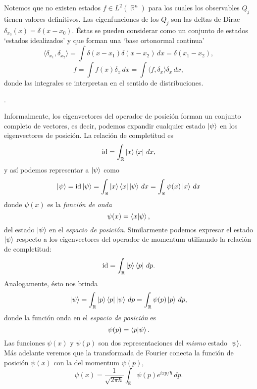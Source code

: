 \documentclass[a4paper]{report}
\DeclareMathOperator{\R}{\mathbb{R}}
\let\H\relax
\DeclareMathOperator{\H}{\mathcal H}
\DeclareMathOperator{\id}{id}
\begin{document}
  Notemos que no existen estados $f \in L^2(\R^{n})$ para
  los cuales los observables $Q_j$ tienen valores
  definitivos. Las eigenfunciones de los $Q_j$ son las
  deltas de Dirac $\delta_{x_0}(x) = \delta(x - x_0)$. Éstas
  se pueden considerar como un conjunto de estados `estados
  idealizados' y que forman una `base ortonormal continua'
  \[
    \langle \delta_{x_1}, \delta_{x_2} \rangle
    = \int \delta(x-x_1)\delta(x-x_2) \, dx
    = \delta(x_1-x_2),
  \] 
  \[
    f = \int f(x)\delta_x \, dx
    = \int \langle f, \delta_x \rangle \delta_x \, dx,
  \] 
  donde las integrales se interpretan en el sentido de
  distribuciones.


  .

  Informalmente, los eigenvectores del operador de posición
  forman un conjunto completo de vectores, es decir, podemos
  expandir cualquier estado $\ket \psi$ en los eigenvectores de
  posición. La relación de completitud es
  \[
    \id_{\H}
    = \int_{\R} \ket x \bra x \, dx, 
  \] 
  y así podemos representar a $\ket \psi$ como
  \begin{equation}
    \ket \psi
    = \id_{\H} \ket \psi
    = \int_{\R} \ket x \bra x \ket \psi \, dx
    = \int_{\R} \psi(x) \ket x \, dx
  \end{equation}
  donde $\psi(x)$ es la \textit{función de onda} 
  \begin{equation}
    \psi(x)
    = \braket{x|\psi},
  \end{equation}
  del estado $\ket \psi$ en el \textit{espacio de posición}.
  Similarmente podemos expresar el estado $\ket \psi$ 
  respecto a los eigenvectores del operador de momentum
  utilizando la relación de completitud:
  \[
    \id_{\H}
    = \int_{\R} \ket p \bra p \, dp.
  \] 
  Analogamente, ésto nos brinda
  \begin{equation}
    \ket \psi
    = \int_{\R} \ket p \bra p \ket \psi \, dp
    = \int_{\R} \psi(p) \ket p \, dp,
  \end{equation}
  donde la función onda en el \textit{espacio de posición}
  es
  \begin{equation}
    \psi(p)
    = \braket{p|\psi}.
  \end{equation}
  Las funciones $\psi(x)$ y $\psi(p)$ son dos
  representaciones del \textit{mismo} estado $\ket \psi$.
  Más adelante veremos que la transformada de Fourier
  conecta la función de posición $\psi(x)$ con la del
  momentum $\psi(p)$, 
  \begin{equation}
    \psi(x)
    = \frac{1}{\sqrt{2\pi\hbar}} \int_{\R} \psi(p)e^{ixp /
    \hbar} \, dp.
  \end{equation}
\end{document}
